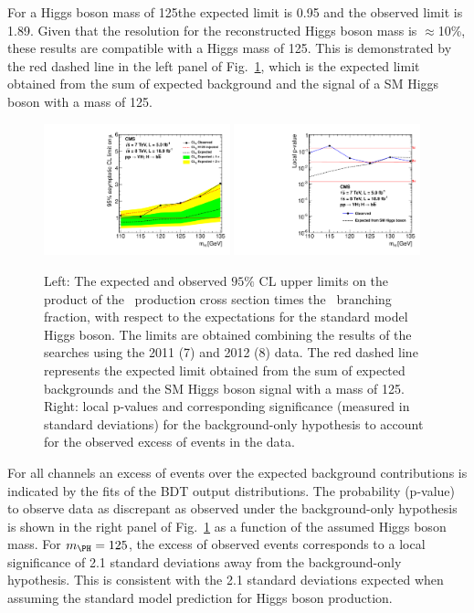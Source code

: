 \documentclass[12pt,twoside,a4paper,cmspaper,final,collab]{cms-tdr}
\begin{document}
For a Higgs
boson mass of 125\GeV the expected limit is 0.95 and the observed
limit is 1.89. Given that the resolution for the reconstructed Higgs
boson mass is $\approx$10\%, these results are compatible with a
Higgs mass of 125\GeV. This is demonstrated by the red dashed line in
the left panel of Fig.~\ref{fig:Limits}, which is the expected
limit obtained from the sum of expected background and the signal
of a SM Higgs boson with a mass of 125\GeV.


\begin{figure}[tbh]
  \begin{center}
   \includegraphics[width=0.48\textwidth]{PRD_limits_Oct08}
   \includegraphics[width=0.48\textwidth]{PRD_pvalue_Sept11}
   \caption{Left: The expected and observed $95\%$ CL upper limits on the
product of the \VH\ production cross section times the \HBB\
branching fraction, with respect to the expectations for the standard model
Higgs boson. The limits are obtained combining the results of the
searches using the 2011 (7\TeV) and 2012
(8\TeV) data. The red dashed line represents the
expected limit obtained from the sum of expected backgrounds and the SM Higgs boson signal
with a mass of 125\GeV. Right: local p-values and corresponding significance
(measured in standard deviations) for the background-only hypothesis to account for
the observed excess of events in the data.}
    \label{fig:Limits}
  \end{center}
\end{figure}


For all channels an excess of events over the expected background
contributions is indicated by the fits of the BDT output distributions.
The probability  (p-value)  to observe data as discrepant as observed
under the background-only hypothesis is shown in
the right panel of Fig.~\ref{fig:Limits} as a function of the assumed
Higgs boson mass.
For $\mH =125$\GeV, the excess of observed events corresponds to a
local significance of 2.1 standard deviations away from the background-only hypothesis.
This is consistent with the 2.1 standard deviations expected when assuming the standard model prediction for Higgs boson
production.
\end{document}
